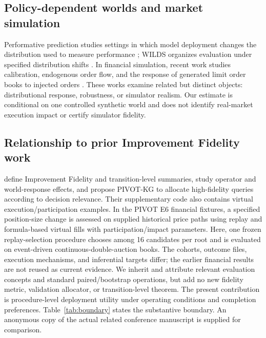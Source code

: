 \documentclass[10pt,letterpaper]{article}
\begin{document}
\subsection{Policy-dependent worlds and market simulation}
Performative prediction studies settings in which model deployment changes the distribution used to measure performance \citep{perdomo2020}; WILDS organizes evaluation under specified distribution shifts \citep{koh2021}. In financial simulation, recent work studies calibration, endogenous order flow, and the response of generated limit order books to injected orders \citep{noble2026,nigmatulin2026}. These works examine related but distinct objects: distributional response, robustness, or simulator realism. Our estimate is conditional on one controlled synthetic world and does not identify real-market execution impact or certify simulator fidelity.

\subsection{Relationship to prior Improvement Fidelity work}
\citet{pivot} define Improvement Fidelity and transition-level summaries, study operator and world-response effects, and propose PIVOT-KG to allocate high-fidelity queries according to decision relevance. Their supplementary code also contains virtual execution/participation examples. In the PIVOT E6 financial fixtures, a specified position-size change is assessed on supplied historical price paths using replay and formula-based virtual fills with participation/impact parameters. Here, one frozen replay-selection procedure chooses among 16 candidates per root and is evaluated on event-driven continuous-double-auction books. The cohorts, outcome files, execution mechanisms, and inferential targets differ; the earlier financial results are not reused as current evidence. We inherit and attribute relevant evaluation concepts and standard paired/bootstrap operations, but add no new fidelity metric, validation allocator, or transition-level theorem. The present contribution is procedure-level deployment utility under operating conditions and completion preferences. Table~\ref{tab:boundary} states the substantive boundary. An anonymous copy of the actual related conference manuscript is supplied for comparison.
\end{document}

